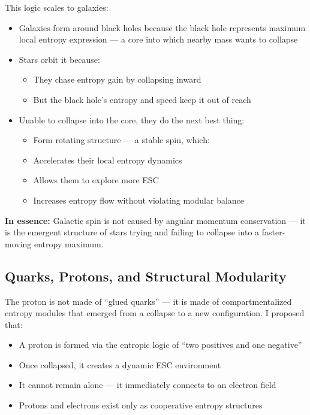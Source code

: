 \documentclass[12pt]{article}
\begin{document}
This logic scales to galaxies:
\begin{itemize}
    \item Galaxies form around black holes because the black hole represents maximum local entropy expression — a core into which nearby mass wants to collapse
    \item Stars orbit it because:
    \begin{itemize}
        \item They chase entropy gain by collapsing inward
        \item But the black hole’s entropy and speed keep it out of reach
    \end{itemize}
    \item Unable to collapse into the core, they do the next best thing:
    \begin{itemize}
        \item Form rotating structure — a stable spin, which:
        \item Accelerates their local entropy dynamics
        \item Allows them to explore more ESC
        \item Increases entropy flow without violating modular balance
    \end{itemize}
\end{itemize}

\noindent
\textbf{In essence:} Galactic spin is not caused by angular momentum conservation — it is the emergent structure of stars trying and failing to collapse into a faster-moving entropy maximum.

\subsection{Quarks, Protons, and Structural Modularity}

The proton is not made of ``glued quarks'' — it is made of compartmentalized entropy modules that emerged from a collapse to a new configuration. I proposed that:
\begin{itemize}
    \item A proton is formed via the entropic logic of ``two positives and one negative''
    \item Once collapsed, it creates a dynamic ESC environment
    \item It cannot remain alone — it immediately connects to an electron field
    \item Protons and electrons exist only as cooperative entropy structures
\end{itemize}
\end{document}
